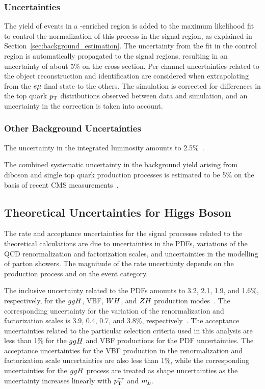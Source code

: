 \subsubsection{\ttbar Uncertainties}
The yield of events in a \ttbar-enriched region is added to the maximum likelihood fit to control the normalization of this process
in the signal region, as explained in Section~\ref{sec:background_estimation}. The uncertainty from the fit in the 
control region is automatically propagated to the signal regions, resulting in an uncertainty of about 5\% on the 
\ttbar cross section. Per-channel uncertainties related to the object reconstruction and identification are 
considered when extrapolating from the $e\mu$ final state to the others. The \ttbar simulation is corrected 
for differences in the top quark $p_\mathrm{T}$ distributions observed between data and simulation, and an uncertainty 
in the correction is taken into account.

\subsubsection{Other Background Uncertainties}
The uncertainty in the integrated luminosity amounts to 2.5\%~\cite{CMS-PAS-LUM-17-001}.

The combined systematic uncertainty in the background yield arising from diboson and single top quark production 
processes is estimated to be 5\%
on the basis of recent CMS measurements~\cite{Khachatryan:2016tgp,Sirunyan:2016cdg}.


\subsection{Theoretical Uncertainties for Higgs Boson}
The rate and acceptance uncertainties for the signal processes related to the theoretical calculations are 
due to uncertainties in the PDFs, variations of the QCD renormalization and factorization scales,
and uncertainties in the modelling of parton showers.
The magnitude of the rate uncertainty depends on the production process and on the event category.

The inclusive uncertainty related to the PDFs amounts to 3.2, 2.1, 1.9, and 1.6\%, respectively, for 
the $ ggH $, VBF, $WH$, and $ZH$ production modes~\cite{deFlorian:2016spz}. The
corresponding uncertainty for the variation of the renormalization and factorization scales is 
3.9, 0.4, 0.7, and 3.8\%, respectively~\cite{deFlorian:2016spz}.
The acceptance uncertainties related to the particular selection criteria used in this analysis are less 
than 1\% for the $ ggH $ and VBF productions for the PDF
uncertainties. The acceptance uncertainties for the VBF production in the renormalization and factorization 
scale uncertainties are also less than 1\%, while the corresponding uncertainties for the $ ggH $ 
process are treated as shape uncertainties as the uncertainty increases
linearly with $p_\mathrm{T}^{\tau\tau}$ and $m_\mathrm{jj}$.

